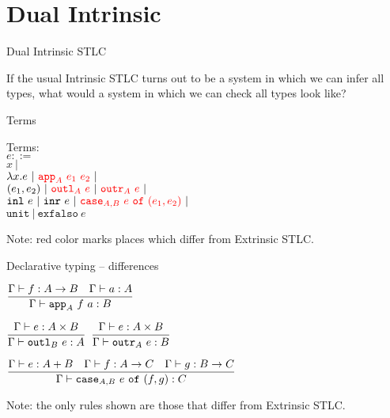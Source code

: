 \documentclass{beamer}
\newcommand{\pipe}{\ |\ }
\newcommand{\Fun}[2]{#1 \to #2}
\newcommand{\Prod}[2]{#1 \times #2}
\newcommand{\Sum}[2]{#1 + #2}
\newcommand{\fun}[2]{\lambda #1. #2}
\newcommand{\pair}[2]{(#1, #2)}
\newcommand{\inl}[1]{\texttt{inl}\ #1}
\newcommand{\inr}[1]{\texttt{inr}\ #1}
\newcommand{\unit}{\texttt{unit}}
\newcommand{\exfalso}[1]{\texttt{exfalso}\ #1}
\newcommand{\fulltyping}[3]{#1 \vdash #2 : #3}
\newcommand{\typing}[2]{\fulltyping{\Gamma}{#1}{#2}}
\newcommand{\rulename}[1]{\textsc{\footnotesize{#1}}}
\newcommand{\infrule}[3][]{\displaystyle \frac{#2}{#3} \rulename{#1}}
\begin{document}
\section{Dual Intrinsic}

\newcommand{\iapp}[3]{\texttt{app}_{#1}\ #2\ #3}
\newcommand{\ioutl}[2]{\texttt{outl}_{#1}\ #2}
\newcommand{\ioutr}[2]{\texttt{outr}_{#1}\ #2}
\newcommand{\icase}[5]{\texttt{case}_{#1, #2}\ #3\ \texttt{of}\ (#4, #5)}

\begin{frame}{Dual Intrinsic STLC}

If the usual Intrinsic STLC turns out to be a system in which we can infer all types, what would a system in which we can check all types look like?

\end{frame}

\begin{frame}{Terms}

Terms: \\
$e ::=$ \\
\qquad $x \pipe$ \\
\qquad $\fun{x}{e} \pipe \termdiff{\iapp{A}{e_1}{e_2}} \pipe$ \\
\qquad $\pair{e_1}{e_2} \pipe \termdiff{\ioutl{A}{e}} \pipe \termdiff{\ioutr{A}{e}} \pipe$ \\
\qquad $\inl{e} \pipe \inr{e} \pipe \termdiff{\icase{A}{B}{e}{e_1}{e_2}} \pipe$ \\
\qquad $\unit \pipe \exfalso{e}$

\vspace{2em}

Note: red color marks places which differ from Extrinsic STLC.

\end{frame}

\begin{frame}{Declarative typing -- differences}

\begin{center}
  $\infrule{\typing{f}{\Fun{A}{B}} \quad \typing{a}{A}}{\typing{\iapp{A}{f}{a}}{B}}$

  \vspace{2em}

  $\infrule{\typing{e}{\Prod{A}{B}}}{\typing{\ioutl{B}{e}}{A}}$ \quad
  $\infrule{\typing{e}{\Prod{A}{B}}}{\typing{\ioutr{A}{e}}{B}}$ \quad

  \vspace{2em}

  $\infrule{\typing{e}{\Sum{A}{B}} \quad \typing{f}{\Fun{A}{C}} \quad \typing{g}{\Fun{B}{C}}}{\typing{\icase{A}{B}{e}{f}{g}}{C}}$
\end{center}

\vspace{2em}

Note: the only rules shown are those that differ from Extrinsic STLC.

\end{frame}
\end{document}
